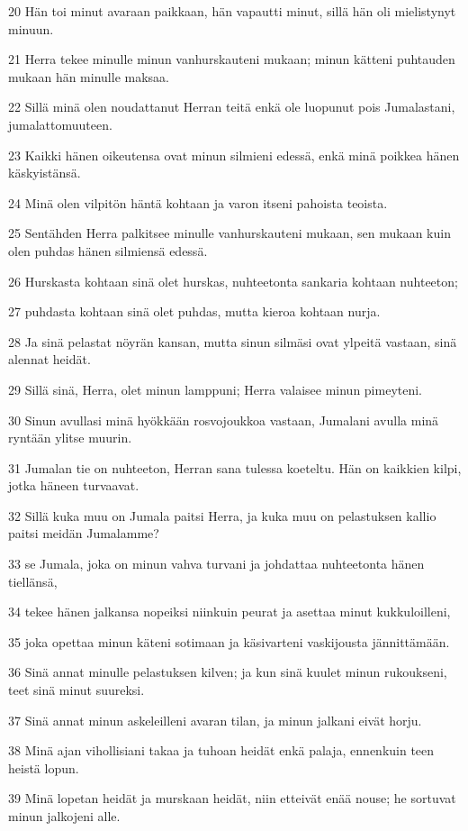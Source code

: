 \par 20 Hän toi minut avaraan paikkaan, hän vapautti minut, sillä hän oli mielistynyt minuun.
\par 21 Herra tekee minulle minun vanhurskauteni mukaan; minun kätteni puhtauden mukaan hän minulle maksaa.
\par 22 Sillä minä olen noudattanut Herran teitä enkä ole luopunut pois Jumalastani, jumalattomuuteen.
\par 23 Kaikki hänen oikeutensa ovat minun silmieni edessä, enkä minä poikkea hänen käskyistänsä.
\par 24 Minä olen vilpitön häntä kohtaan ja varon itseni pahoista teoista.
\par 25 Sentähden Herra palkitsee minulle vanhurskauteni mukaan, sen mukaan kuin olen puhdas hänen silmiensä edessä.
\par 26 Hurskasta kohtaan sinä olet hurskas, nuhteetonta sankaria kohtaan nuhteeton;
\par 27 puhdasta kohtaan sinä olet puhdas, mutta kieroa kohtaan nurja.
\par 28 Ja sinä pelastat nöyrän kansan, mutta sinun silmäsi ovat ylpeitä vastaan, sinä alennat heidät.
\par 29 Sillä sinä, Herra, olet minun lamppuni; Herra valaisee minun pimeyteni.
\par 30 Sinun avullasi minä hyökkään rosvojoukkoa vastaan, Jumalani avulla minä ryntään ylitse muurin.
\par 31 Jumalan tie on nuhteeton, Herran sana tulessa koeteltu. Hän on kaikkien kilpi, jotka häneen turvaavat.
\par 32 Sillä kuka muu on Jumala paitsi Herra, ja kuka muu on pelastuksen kallio paitsi meidän Jumalamme?
\par 33 se Jumala, joka on minun vahva turvani ja johdattaa nuhteetonta hänen tiellänsä,
\par 34 tekee hänen jalkansa nopeiksi niinkuin peurat ja asettaa minut kukkuloilleni,
\par 35 joka opettaa minun käteni sotimaan ja käsivarteni vaskijousta jännittämään.
\par 36 Sinä annat minulle pelastuksen kilven; ja kun sinä kuulet minun rukoukseni, teet sinä minut suureksi.
\par 37 Sinä annat minun askeleilleni avaran tilan, ja minun jalkani eivät horju.
\par 38 Minä ajan vihollisiani takaa ja tuhoan heidät enkä palaja, ennenkuin teen heistä lopun.
\par 39 Minä lopetan heidät ja murskaan heidät, niin etteivät enää nouse; he sortuvat minun jalkojeni alle.
